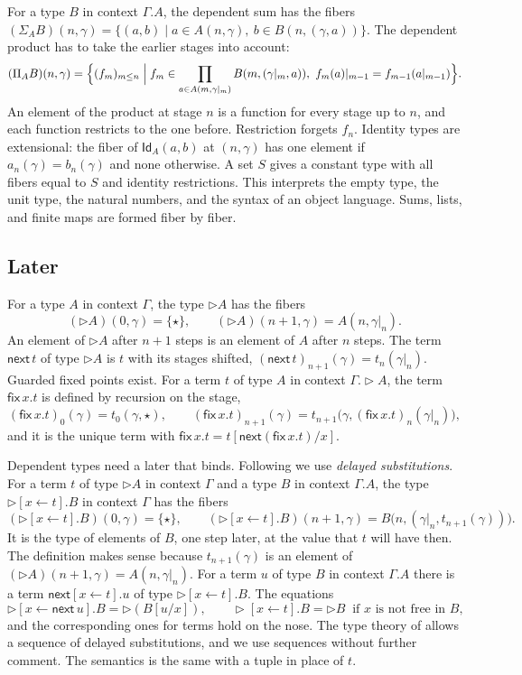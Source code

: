 \documentclass[acmsmall,nonacm,screen]{acmart}
\newcommand{\later}{{\triangleright}}
\newcommand{\nxt}{\mathsf{next}}
\newcommand{\fix}{\mathsf{fix}}
\newcommand{\Id}{\mathsf{Id}}
\newcommand{\dsub}[2]{[#1 \leftarrow #2]}
\newcommand{\rest}[2]{#1|_{#2}}
\begin{document}
For a type $B$ in context $\Gamma.A$, the dependent sum has the fibers
$(\Sigma_A B)(n,\gamma) = \{(a,b) \mid a \in A(n,\gamma),\ b \in B(n,(\gamma,a))\}$. The
dependent product has to take the earlier stages into account:
\begin{equation}\label{eq:pi}
  (\Pi_A B)(n,\gamma) = \Bigl\{ (f_m)_{m \le n} \Bigm|
     f_m \in \prod_{a \in A(m,\rest{\gamma}{m})} B(m,(\rest{\gamma}{m},a)),\
     \rest{f_m(a)}{m-1} = f_{m-1}(\rest{a}{m-1}) \Bigr\}.
\end{equation}
An element of the product at stage $n$ is a function for every stage up to $n$, and each
function restricts to the one before. Restriction forgets $f_n$. Identity types are
extensional: the fiber of $\Id_A(a,b)$ at $(n,\gamma)$ has one element if
$a_n(\gamma) = b_n(\gamma)$ and none otherwise. A set $S$ gives a constant type with all
fibers equal to $S$ and identity restrictions. This interprets the empty type, the unit
type, the natural numbers, and the syntax of an object language. Sums, lists, and finite
maps are formed fiber by fiber.

\subsection{Later}

For a type $A$ in context $\Gamma$, the type $\later A$ has the fibers
\[
  (\later A)(0,\gamma) = \{\star\}, \qquad (\later A)(n+1,\gamma) = A(n,\rest{\gamma}{n}).
\]
An element of $\later A$ after $n+1$ steps is an element of $A$ after $n$ steps. The term
$\nxt\,t$ of type $\later A$ is $t$ with its stages shifted,
$(\nxt\,t)_{n+1}(\gamma) = t_n(\rest{\gamma}{n})$. Guarded fixed points exist. For a term $t$
of type $A$ in context $\Gamma.\later A$, the term $\fix\,x.t$ is defined by recursion on
the stage,
\[
  (\fix\,x.t)_0(\gamma) = t_0(\gamma,\star), \qquad
  (\fix\,x.t)_{n+1}(\gamma) = t_{n+1}\bigl(\gamma,(\fix\,x.t)_n(\rest{\gamma}{n})\bigr),
\]
and it is the unique term with $\fix\,x.t = t[\nxt(\fix\,x.t)/x]$.

Dependent types need a later that binds. Following \citet{gDTT2016} we use \emph{delayed
substitutions}. For a term $t$ of type $\later A$ in context $\Gamma$ and a type $B$ in
context $\Gamma.A$, the type $\later\dsub{x}{t}.B$ in context $\Gamma$ has the fibers
\begin{equation}\label{eq:delayed}
  (\later\dsub{x}{t}.B)(0,\gamma) = \{\star\}, \qquad
  (\later\dsub{x}{t}.B)(n+1,\gamma) = B\bigl(n,(\rest{\gamma}{n},t_{n+1}(\gamma))\bigr).
\end{equation}
It is the type of elements of $B$, one step later, at the value that $t$ will have then.
The definition makes sense because $t_{n+1}(\gamma)$ is an element of
$(\later A)(n+1,\gamma) = A(n,\rest{\gamma}{n})$. For a term $u$ of type $B$ in context
$\Gamma.A$ there is a term $\nxt\dsub{x}{t}.u$ of type $\later\dsub{x}{t}.B$. The equations
\[
  \later\dsub{x}{\nxt\,u}.B = \later(B[u/x]), \qquad
  \later\dsub{x}{t}.B = \later B \ \text{ if $x$ is not free in $B$},
\]
and the corresponding ones for terms hold on the nose. The type theory of \citet{gDTT2016}
allows a sequence of delayed substitutions, and we use sequences without further comment.
The semantics is the same with a tuple in place of $t$.
\end{document}
